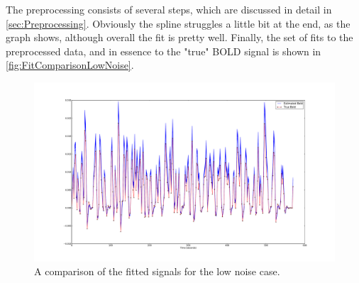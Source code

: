 The preprocessing consists of several steps, which are discussed in detail in \autoref{sec:Preprocessing}.
Obviously the spline struggles a little bit at the end, as the graph shows, although 
overall the fit is pretty well. Finally, the set of fits to the preprocessed data, and in 
essence to the "true" BOLD signal is shown in \autoref{fig:FitComparisonLowNoise}.

\begin{figure}
\label{fig:FitComparisonLowNoise}
\includegraphics[trim=6cm 3cm 6cm 3cm,width=16cm]{images/comparison_lownoise}
\caption{A comparison of the fitted signals for the low noise case.}
\end{figure}

